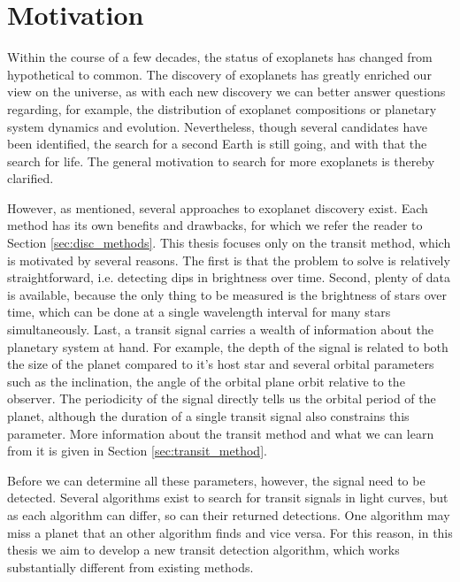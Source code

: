 
\section{Motivation}

Within the course of a few decades, the status of exoplanets has changed from hypothetical to common. The discovery of exoplanets has greatly enriched our view on the universe, as with each new discovery we can better answer questions regarding, for example, the distribution of exoplanet compositions or planetary system dynamics and evolution. Nevertheless, though several candidates have been identified, the search for a second Earth is still going, and with that the search for life. The general motivation to search for more exoplanets is thereby clarified. 

However, as mentioned, several approaches to exoplanet discovery exist. Each method has its own benefits and drawbacks, for which we refer the reader to Section \ref{sec:disc_methods}. This thesis focuses only on the transit method, which is motivated by several reasons. The first is that the problem to solve is relatively straightforward, i.e. detecting dips in brightness over time. Second, plenty of data is available, because the only thing to be measured is the brightness of stars over time, which can be done at a single wavelength interval for many stars simultaneously. Last, a transit signal carries a wealth of information about the planetary system at hand. For example, the depth of the signal is related to both the size of the planet compared to it's host star and several orbital parameters such as the inclination, the angle of the orbital plane orbit relative to the observer. The periodicity of the signal directly tells us the orbital period of the planet, although the duration of a single transit signal also constrains this parameter. More information about the transit method and what we can learn from it is given in Section \ref{sec:transit_method}. 

Before we can determine all these parameters, however, the signal need to be detected. Several algorithms exist to search for transit signals in light curves, but as each algorithm can differ, so can their returned detections. One algorithm may miss a planet that an other algorithm finds and vice versa. For this reason, in this thesis we aim to develop a new transit detection algorithm, which works substantially different from existing methods.


